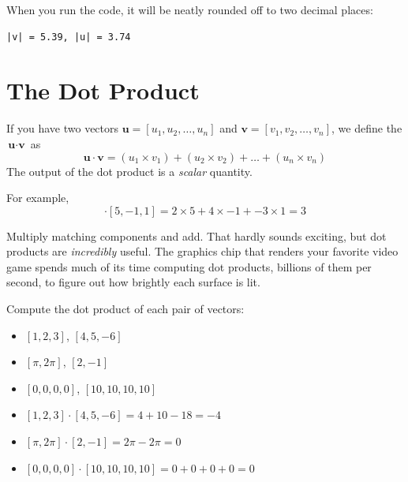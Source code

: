 When you run the code, it will be neatly rounded off to two decimal places:
\begin{verbatim}
|v| = 5.39, |u| = 3.74
\end{verbatim}


\section{The Dot Product}

If you have two vectors $\textbf{u} = [u_1, u_2, \dots, u_n]$ and $\textbf{v} 
= [v_1, v_2,\dots, v_n]$, we define the  $\textbf{u} 
\cdot \textbf{v}$ as 
\begin{equation*}
     \textbf{u} \cdot \textbf{v} = (u_1 \times v_1) + (u_2 \times v_2) + \dots 
     + (u_n \times v_n)
\end{equation*} 
The output of the dot product is a \emph{scalar} quantity.


For example, 
\begin{equation*}
    [2,4, -3] \cdot [5, -1, 1] = 2 \times 5 + 4 \times -1 + -3 \times 1 = 3
\end{equation*}

Multiply matching components and add. That hardly sounds exciting, but dot
products are \emph{incredibly} useful. The graphics chip that renders your
favorite video game spends much of its time computing dot products, billions
of them per second, to figure out how brightly each surface is lit. 

\begin{Exercise}[title={Basic dot products}, label=dot_products]
    Compute the dot product of each pair of vectors:
    \begin{itemize}
        \item $[1, 2, 3]$, $[4, 5, -6]$
        \item $[\pi, 2\pi]$, $[2, -1]$
        \item $[0,0,0,0]$, $[10,10,10,10]$
    \end{itemize}
\end{Exercise}
\begin{Answer}[ref=dot_products]
        \begin{itemize}
            \item $[1, 2, 3] \cdot [4, 5, -6] = 4 + 10 - 18 = -4$
            \item $[\pi, 2\pi] \cdot [2, -1] = 2\pi - 2\pi = 0$
            \item $[0,0,0,0] \cdot [10,10,10,10] = 0 + 0 + 0 + 0 = 0$ 
        \end{itemize}
\end{Answer}


